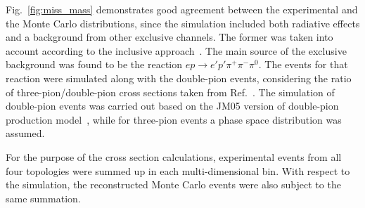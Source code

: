 \documentclass[prc,twocolumn,superscriptaddress,showpacs,amssymb,amsmath,amsfonts,aps,nofootinbib]{revtex4-1}
\begin{document}
 
Fig.~\ref{fig:miss_mass} demonstrates good agreement between the experimental and the Monte Carlo distributions,  since the simulation included both radiative effects and a background from other exclusive channels. 
The former was taken into account according to the inclusive approach~\cite{Mo:1968cg}. 
The main source of the exclusive background was found to be the reaction $e p \rightarrow e' p' \pi^{+} \pi^{-} \pi^{0}$. The events for that reaction were simulated along  with the double-pion events, 
considering the ratio of three-pion/double-pion cross sections
 taken from Ref.~\cite{Wu:2005wf}. The simulation of double-pion events was carried out based on the JM05 version of double-pion production model~\cite{Ripani:2000va,Aznauryan:2005tp,Mokeev:2005re}, while for three-pion events a phase space distribution was assumed. 
 
For the purpose of the cross section calculations, experimental events from all four topologies were summed up in each multi-dimensional bin. With respect to the simulation, the reconstructed Monte Carlo events were also subject to the same summation.




























\end{document}
